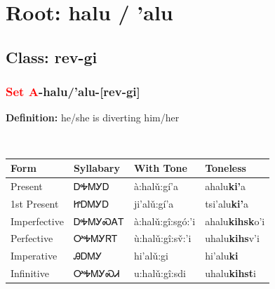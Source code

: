 \needspace{4in}
\section*{Root: halu / 'alu}
\nopagebreak
{}
\needspace{3in}
\subsection*{Class: rev-gi}
\nopagebreak
\needspace{2in}
\subsubsection*{\textcolor{Red}{Set A}{-}\textbf{halu/'alu}{-}[rev-gi]}
\nopagebreak
\textbf{Definition: } he/she is diverting him/her
\\[0.5em]
\begin{tabularx}{\textwidth}{l X X X}%
\toprule%
\textbf{Form}&\textbf{Syllabary}&\textbf{With Tone}&\textbf{Toneless}\\%
\midrule%
Present&ᎠᎭᎷᎩᎠ&à:halǔ:gí’a&ahalu\textbf{ki'}a\\%
1st Present&ᏥᎠᎷᎩᎠ&ji’alǔ:gí’a&tsi'alu\textbf{ki'}a\\%
Imperfective&ᎠᎭᎷᎩᏍᎪᎢ&à:halǔ:gî:sgó:’i&ahalu\textbf{kihsk}o'i\\%
Perfective&ᎤᎭᎷᎩᏒᎢ&ù:halǔ:gî:sv̌:’i&uhalu\textbf{kihs}v'i\\%
Imperative&ᎯᎠᎷᎩ&hi’alǔ:gi&hi'alu\textbf{ki}\\%
Infinitive&ᎤᎭᎷᎩᏍᏗ&u:halǔ:gî:sdi&uhalu\textbf{kihst}i\\%
\bottomrule%
\end{tabularx}
\\[1em]